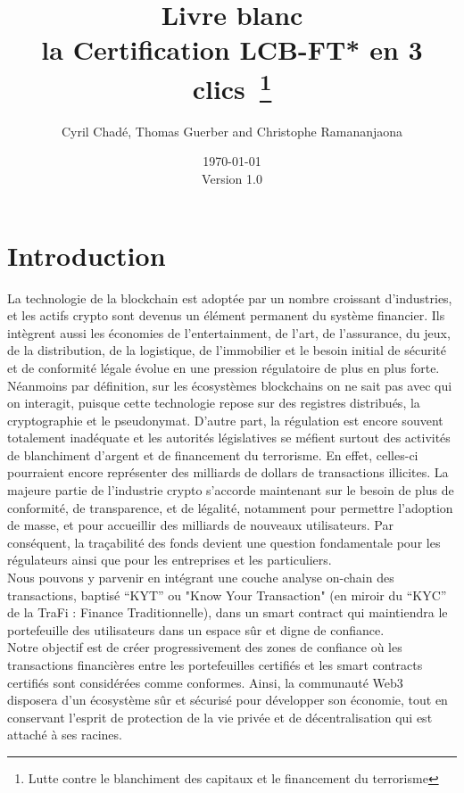 ﻿\documentclass[a4paper]{article}
\newcommand{\version}{\vspace{10pt}\\ Version 1.0}
\begin{document}
\title{Livre blanc \vspace{10pt} \\
\large la Certification LCB-FT* en 3 clics~\footnote{Lutte contre le blanchiment des capitaux et le financement du terrorisme}}
\author{Cyril Chad\'e, Thomas Guerber and Christophe Ramananjaona}
\date{\today\version}
\maketitle
\thispagestyle{fancy}
\tableofcontents
\newpage
\section{Introduction}

La technologie de la blockchain est adoptée par un nombre croissant d’industries, et les actifs crypto sont devenus un élément permanent du système financier. Ils intègrent aussi les économies de l’entertainment, de l’art, de l’assurance, du jeux, de la distribution, de la logistique, de l’immobilier et le besoin initial de sécurité et de conformité légale évolue en une pression régulatoire de plus en plus forte. 
Néanmoins par définition, sur les écosystèmes blockchains on ne sait pas avec qui on interagit, puisque cette technologie repose sur des registres distribués, la cryptographie et le pseudonymat. D’autre part, la régulation est encore souvent totalement inadéquate et les autorités législatives se méfient surtout des activités de blanchiment d’argent et de financement du terrorisme. En effet, celles-ci pourraient encore représenter des milliards de dollars de transactions illicites.
La majeure partie de l’industrie crypto s’accorde maintenant sur le besoin de plus de conformité, de transparence, et de légalité, notamment pour permettre l’adoption de masse, et pour accueillir des milliards de nouveaux utilisateurs. Par conséquent, la traçabilité des fonds devient une question fondamentale pour les régulateurs ainsi que pour les entreprises et les particuliers. \\

Nous pouvons y parvenir en intégrant une couche analyse on-chain des transactions, baptisé “KYT” ou "Know Your Transaction" (en miroir du “KYC” de la TraFi : Finance Traditionnelle), dans un smart contract qui maintiendra le portefeuille des utilisateurs dans un espace sûr et digne de confiance. \\

Notre objectif est de créer progressivement des zones de confiance où les transactions financières entre les portefeuilles certifiés et les smart contracts certifiés sont considérées comme conformes. Ainsi, la communauté Web3 disposera d'un écosystème sûr et sécurisé pour développer son économie, tout en conservant l'esprit de protection de la vie privée et de décentralisation qui est attaché à ses racines. \\
\end{document}
